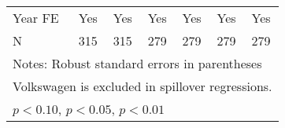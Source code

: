 \begin{table}[htbp]
\begin{tabular}{l*{6}{c}}
Year FE             &         Yes         &         Yes         &         Yes         &         Yes         &         Yes         &         Yes         \\
N                   &         315         &         315         &         279         &         279         &         279         &         279         \\
\bottomrule
\multicolumn{7}{l}{\footnotesize Notes: Robust standard errors in parentheses}\\
\multicolumn{7}{l}{\footnotesize Volkswagen is excluded in spillover regressions.}\\
\multicolumn{7}{l}{\footnotesize \sym{*} \(p<0.10\), \sym{**} \(p<0.05\), \sym{***} \(p<0.01\)}\\
\end{tabular}
\end{table}
